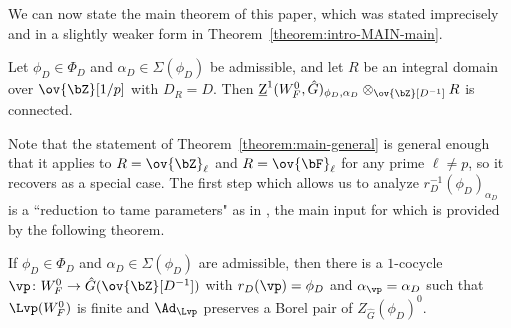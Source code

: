 We can now state the main theorem of this paper, which was stated imprecisely and in a slightly weaker form in Theorem~\ref{theorem:intro-MAIN-main}.

\begin{theorem}\label{theorem:main-general}
    Let $\phi_D \in \Phi_D$ and $\alpha_D \in \Sigma(\phi_D)$ be admissible, and let $R$ be an integral domain over $\ov{\bZ}[1/p]$ with $D_R = D$. Then $\underline{\rm{Z}}^1(W_F^0, \hat{G})_{\phi_D, \alpha_D} \otimes_{\ov{\bZ}[D^{-1}]} R$ is connected.
\end{theorem}

Note that the statement of Theorem~\ref{theorem:main-general} is general enough that it applies to $R = \ov{\bZ}_{\ell}$ and $R = \ov{\bF}_{\ell}$ for any prime $\ell \neq p$, so it recovers \cite[4.8]{DHKM} as a special case. The first step which allows us to analyze $r_D^{-1}(\phi_D)_{\alpha_D}$ is a ``reduction to tame parameters" as in \cite{DHKM}, the main input for which is provided by the following theorem.

\begin{theorem}\label{theorem:tame-reduction}
    If $\phi_D \in \Phi_D$ and $\alpha_D \in \Sigma(\phi_D)$ are admissible, then there is a $1$-cocycle $\vp\colon W_F^0 \to \hat{G}(\ov{\bZ}[D^{-1}])$ with $r_D(\vp) = \phi_D$ and $\alpha_{\vp} = \alpha_D$ such that $\Lvp(W_F^0)$ is finite and $\Ad_{\Lvp}$ preserves a Borel pair of $Z_{\hat{G}}(\phi_D)^0$.
\end{theorem}

